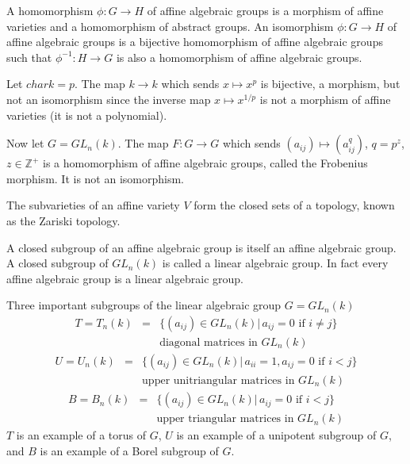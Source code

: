 A homomorphism $\phi: G\rightarrow H$ of affine algebraic groups is a morphism of affine varieties and a homomorphism of abstract groups. An isomorphism $\phi: G\rightarrow H$ of affine algebraic groups is a bijective homomorphism of affine algebraic groups such that $\phi^{-1}:H\rightarrow G$ is also a homomorphism of affine algebraic groups.

\begin{example}
	Let $char k = p$. The map $k\rightarrow k$ which sends $x\mapsto x^p$ is bijective, a morphism, but not an isomorphism since the inverse map $x\mapsto x^{1/p}$ is not a morphism of affine varieties (it is not a polynomial).
	
	Now let $G = GL_n(k)$. The map $F:G\rightarrow G$ which sends $(a_{ij})\mapsto (a_{ij}^q)$, $q = p^z$, $z \in \mathbb{Z}^+$ is a homomorphism of affine algebraic groups, called the Frobenius morphism. It is not an isomorphism.
\end{example}

The subvarieties of an affine variety $V$ form the closed sets of a topology, known as the Zariski topology.

A closed subgroup of an affine algebraic group is itself an affine algebraic group. A closed subgroup of $GL_n(k)$ is called a linear algebraic group. In fact every affine algebraic group is a linear algebraic group.

\begin{example}
	Three important subgroups of the linear algebraic group $G = GL_n(k)$
	\begin{eqnarray*}
		T = T_n(k) &=& \{ (a_{ij}) \in GL_n(k) |\, a_{ij} = 0 \textrm{ if } i \neq j\}\\
		&& \textrm{diagonal matrices in } GL_n(k)
	\end{eqnarray*}
	\begin{eqnarray*}
		U = U_n(k) &=& \{ (a_{ij}) \in GL_n(k) |\, a_{ii} = 1, a_{ij} = 0 \textrm{ if } i < j\}\\
		&& \textrm{upper unitriangular matrices in } GL_n(k)
	\end{eqnarray*}
	\begin{eqnarray*}
		B = B_n(k) &=& \{ (a_{ij}) \in GL_n(k) |\, a_{ij} = 0 \textrm{ if } i < j\}\\
		&& \textrm{upper triangular matrices in } GL_n(k)
	\end{eqnarray*}
	$T$ is an example of a torus of $G$, $U$ is an example of a unipotent subgroup of $G$, and $B$ is an example of a Borel subgroup of $G$.
\end{example}

